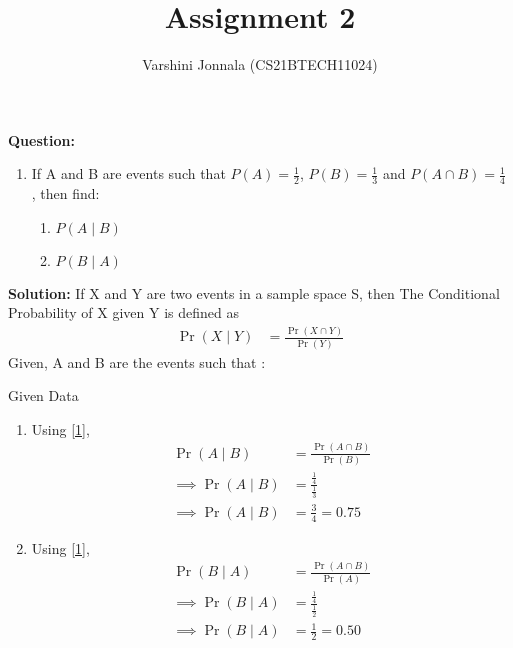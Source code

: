 \documentclass[journal,12pt,twocolumn]{IEEEtran}
\title{Assignment 2}
\author{Varshini Jonnala (CS21BTECH11024)}
\providecommand{\pr}[1]{\ensuremath{\Pr\left(#1\right)}}
\newcommand{\question}{\noindent \textbf{Question: }}
\newcommand{\solution}{\noindent \textbf{Solution: }}
\begin{document}
    \maketitle
    
    \question
    \begin{enumerate}[label=]
        \item  If A and B are events such that $P(A) = \frac{1}{2}$, $P(B)= \frac{1}{3}$ and $P(A \cap B)= \frac{1}{4}$ , then find:
    \begin{enumerate}
        \item $P(A \mid B)$
        \item $P(B \mid A)$
    \end{enumerate}
    \end{enumerate}

    \solution 
     If X and Y are two events in a sample space S,
     then The Conditional Probability of X given Y is defined as
        \begin{align}
        \label{1}  \pr{X \mid Y} &= \frac{\pr{X \cap Y}}{\pr{Y}}  
        \end{align}
        Given, A and B are the events such that :  
        \begin{table}[ht!]
            
        \caption{Given Data}
	        \label{Tables:Table}
        \end{table}
    
        \begin{enumerate}
            \item Using \eqref{1},
            \begin{align}
                \pr{A \mid B} &= \frac{\pr{A \cap B}}{\pr{B}}\\
                \implies \pr{A \mid B} &= {\frac{\frac{1}{4}}{\frac{1}{3}}}\\
                \implies \pr{A \mid B} &= \frac{3}{4} = 0.75
            \end{align}
            
            \item Using \eqref{1},
                \begin{align}
                \pr{B \mid A} &= \frac{\pr{A \cap B}}{\pr{A}}\\
                \implies \pr{B \mid A} &= {\frac{\frac{1}{4}}{\frac{1}{2}}}\\
                \implies \pr{B \mid A} &= \frac{1}{2} = 0.50
            \end{align} 
        \end{enumerate}
    
\end{document}
